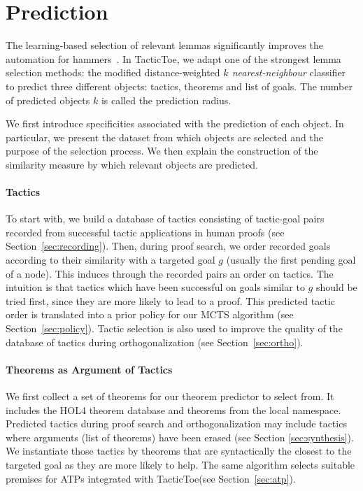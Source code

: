 \documentclass[runningheads,a4paper,draft]{svjour3}
\def\holfour{\textsf{HOL4}\xspace}
\def\tactictoe{\textsf{TacticToe}\xspace}
\begin{document}
\section{Prediction}\label{s:prediction}
The learning-based selection of relevant lemmas significantly improves the 
automation for hammers~\cite{BlanchetteGKKU16}. In \tactictoe, we adapt 
one of the strongest lemma selection 
methods: the modified distance-weighted \emph{$k$ nearest-neighbour} 
classifier~\cite{ckju-pxtp13,DudaniS76} to predict three different objects: 
 tactics, theorems and list of goals. The number of predicted objects $k$ is 
 called the prediction radius.

We first introduce specificities associated with the prediction of each object. 
In particular, we present the dataset from which objects are selected and the 
purpose of the selection process. 
We then explain the construction of the similarity measure by which relevant 
objects are predicted.

\paragraph{Tactics}
To start with, we build a database of tactics consisting
of tactic-goal pairs recorded from successful tactic applications in human 
proofs (see 
Section~\ref{sec:recording}).
Then, during proof search, we order recorded goals according to their 
similarity with a targeted goal $g$ (usually the first pending goal of a node). 
This induces 
through the recorded pairs an 
order on tactics. The intuition is that tactics which have been successful on 
goals similar to $g$ should be tried first, since they are more likely to lead 
to a proof. 
This predicted tactic order is translated into a prior policy for our MCTS 
algorithm (see Section~\ref{sec:policy}).
Tactic selection is also used to improve the quality of the database 
of tactics during orthogonalization (see Section~\ref{sec:ortho}).

\paragraph{Theorems as Argument of Tactics}
We first collect a set of theorems for our theorem predictor to select from.
It includes the \holfour theorem database and theorems from the local namespace.
Predicted tactics during proof search and orthogonalization may include
tactics where arguments (list of theorems) have been erased (see Section 
\ref{sec:synthesis}).
We instantiate those tactics by theorems that are syntactically the closest to 
the targeted goal as they are more likely to help.
The same algorithm selects suitable premises for ATPs integrated with  
\tactictoe (see Section~\ref{sec:atp}).
\end{document}
